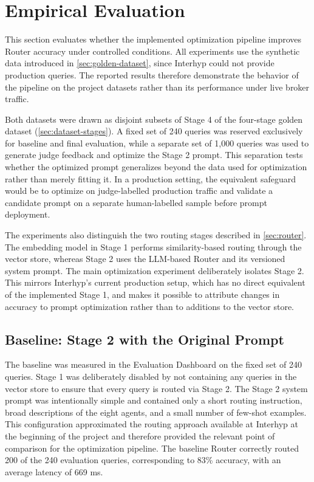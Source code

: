 \clearreportauthor
\section{Empirical Evaluation}\label{sec:empirical-evaluation}

This section evaluates whether the implemented optimization pipeline improves Router accuracy under controlled conditions. All experiments use the synthetic data introduced in \cref{sec:golden-dataset}, since Interhyp could not provide production queries. The reported results therefore demonstrate the behavior of the pipeline on the project datasets rather than its performance under live broker traffic.

Both datasets were drawn as disjoint subsets of Stage 4 of the four-stage golden dataset (\cref{sec:dataset-stages}). A fixed set of 240 queries was reserved exclusively for baseline and final evaluation, while a separate set of 1,000 queries was used to generate judge feedback and optimize the Stage 2 prompt. This separation tests whether the optimized prompt generalizes beyond the data used for optimization rather than merely fitting it. In a production setting, the equivalent safeguard would be to optimize on judge-labelled production traffic and validate a candidate prompt on a separate human-labelled sample before prompt deployment.

The experiments also distinguish the two routing stages described in \cref{sec:router}. The embedding model in Stage 1 performs similarity-based routing through the vector store, whereas Stage 2 uses the LLM-based Router and its versioned system prompt. The main optimization experiment deliberately isolates Stage 2. This mirrors Interhyp's current production setup, which has no direct equivalent of the implemented Stage 1, and makes it possible to attribute changes in accuracy to prompt optimization rather than to additions to the vector store.

\subsection{Baseline: Stage 2 with the Original Prompt}\label{sec:empirical-baseline}

The baseline was measured in the Evaluation Dashboard on the fixed set of 240 queries. Stage 1 was deliberately disabled by not containing any queries in the vector store to ensure that every query is routed via Stage 2. The Stage 2 system prompt was intentionally simple and contained only a short routing instruction, broad descriptions of the eight agents, and a small number of few-shot examples. This configuration approximated the routing approach available at Interhyp at the beginning of the project and therefore provided the relevant point of comparison for the optimization pipeline. The baseline Router correctly routed 200 of the 240 evaluation queries, corresponding to 83\% accuracy, with an average latency of 669 ms.

